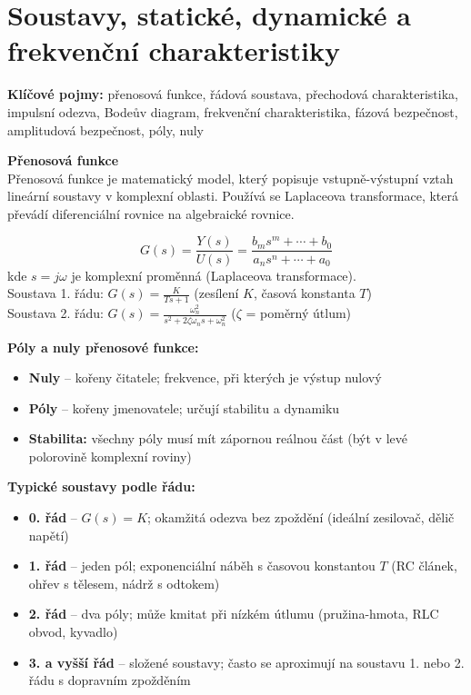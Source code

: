 \documentclass[a4paper,10pt]{article}
\begin{document}
\section{Soustavy, statické, dynamické a frekvenční charakteristiky}

\begin{pojmybox}
\textbf{Klíčové pojmy:}
přenosová funkce, řádová soustava, přechodová charakteristika,
impulsní odezva, Bodeův diagram, frekvenční charakteristika,
fázová bezpečnost, amplitudová bezpečnost, póly, nuly
\end{pojmybox}

\begin{vysvetlenibox}
\textbf{Přenosová funkce}\\
Přenosová funkce je matematický model, který popisuje vstupně-výstupní
vztah lineární soustavy v komplexní oblasti. Používá se Laplaceova
transformace, která převádí diferenciální rovnice na algebraické rovnice.

\begin{vzorcebox}
$$G(s) = \frac{Y(s)}{U(s)} = \frac{b_m s^m + \cdots + b_0}
{a_n s^n + \cdots + a_0}$$
kde $s = j\omega$ je komplexní proměnná (Laplaceova transformace).\\
Soustava 1. řádu: $G(s) = \frac{K}{Ts + 1}$ \quad
(zesílení $K$, časová konstanta $T$)\\
Soustava 2. řádu: $G(s) = \frac{\omega_n^2}{s^2 + 2\zeta\omega_n s + \omega_n^2}$
\quad ($\zeta$ = poměrný útlum)
\end{vzorcebox}

\textbf{Póly a nuly přenosové funkce:}
\begin{itemize}[noitemsep, leftmargin=1.4em, topsep=4pt]
    \item \textbf{Nuly} -- kořeny čitatele; frekvence, při kterých je výstup nulový
    \item \textbf{Póly} -- kořeny jmenovatele; určují stabilitu a dynamiku
    \item \textbf{Stabilita:} všechny póly musí mít zápornou reálnou část
          (být v levé polorovině komplexní roviny)
\end{itemize}

\textbf{Typické soustavy podle řádu:}
\begin{itemize}[noitemsep, leftmargin=1.4em, topsep=4pt]
    \item \textbf{0. řád} -- $G(s) = K$; okamžitá odezva bez zpoždění
          (ideální zesilovač, dělič napětí)
    \item \textbf{1. řád} -- jeden pól; exponenciální náběh s časovou konstantou $T$
          (RC článek, ohřev s tělesem, nádrž s odtokem)
    \item \textbf{2. řád} -- dva póly; může kmitat při nízkém útlumu
          (pružina-hmota, RLC obvod, kyvadlo)
    \item \textbf{3. a vyšší řád} -- složené soustavy; často se aproximují
          na soustavu 1. nebo 2. řádu s dopravním zpožděním
\end{itemize}


\end{vysvetlenibox}
\end{document}
